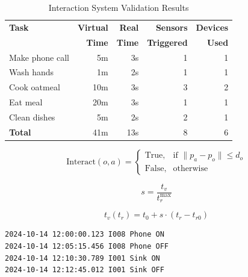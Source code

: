 \begin{table}[t]
\centering
\caption{Interaction System Validation Results}
\label{tab:validation_results}
\begin{tabular}{@{}lrrrr@{}}
\toprule
\textbf{Task} & \textbf{Virtual} & \textbf{Real} & \textbf{Sensors} & \textbf{Devices} \\
& \textbf{Time} & \textbf{Time} & \textbf{Triggered} & \textbf{Used} \\
\midrule
Make phone call & 5m & 3s & 1 & 1 \\
Wash hands & 1m & 2s & 1 & 1 \\
Cook oatmeal & 10m & 3s & 3 & 2 \\
Eat meal & 20m & 3s & 1 & 1 \\
Clean dishes & 5m & 2s & 2 & 1 \\
\midrule
\textbf{Total} & 41m & 13s & 8 & 6 \\
\bottomrule
\end{tabular}
\end{table}



\begin{equation}
    \text{Interact}(o, a) = \begin{cases}
        \text{True}, & \text{if } \|p_a - p_o\| \leq d_o \\
        \text{False}, & \text{otherwise}
    \end{cases}
\end{equation}

\begin{equation}
    s = \frac{t_v}{t_r^{\max}}
\end{equation}

\begin{equation}
    t_v(t_r) = t_0 + s \cdot (t_r - t_{r0})
\end{equation}



\begin{lstlisting}[caption={CASAS-Compatible Sensor Log Format},label={lst:casas_format}]
2024-10-14 12:00:00.123 I008 Phone ON
2024-10-14 12:05:15.456 I008 Phone OFF
2024-10-14 12:10:30.789 I001 Sink ON
2024-10-14 12:12:45.012 I001 Sink OFF
\end{lstlisting}

